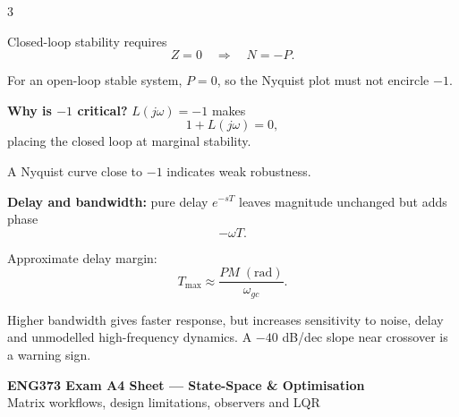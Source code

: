 \documentclass[a4paper,8pt]{extarticle}
\newcommand{\tinyhead}[1]{\textbf{#1}\;}
\begin{document}
\begin{multicols}{3}
{Closed-loop stability requires
\[
Z=0
\quad\Rightarrow\quad
N=-P.
\]

For an open-loop stable system, $P=0$, so the Nyquist plot must not encircle $-1$.

\tinyhead{Why is $-1$ critical?}
$L(j\omega)=-1$ makes
\[
1+L(j\omega)=0,
\]
placing the closed loop at marginal stability.

A Nyquist curve close to $-1$ indicates weak robustness.

\tinyhead{Delay and bandwidth:}
pure delay $e^{-sT}$ leaves magnitude unchanged but adds phase
\[
-\omega T.
\]

Approximate delay margin:
\[
T_{\max}\approx
\frac{PM\;(\mathrm{rad})}{\omega_{gc}}.
\]

Higher bandwidth gives faster response, but increases sensitivity to noise, delay and unmodelled high-frequency dynamics. A $-40$ dB/dec slope near crossover is a warning sign.
}

\end{multicols}

\newpage
\begin{center}
{\Large\textbf{ENG373 Exam A4 Sheet --- State-Space \& Optimisation}}\\[-2pt]
{\scriptsize Matrix workflows, design limitations, observers and LQR}
\end{center}
\vspace{-5pt}
\end{document}

